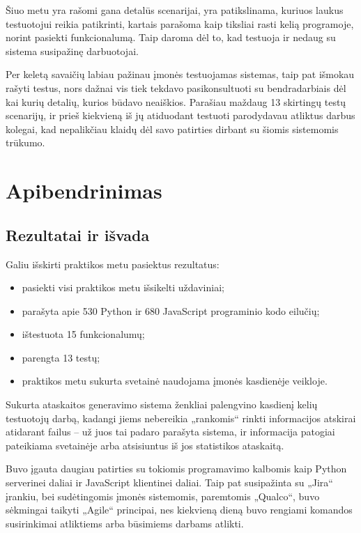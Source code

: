 \documentclass{VUMIFPSkursinis}
\begin{document}
Šiuo metu yra rašomi gana detalūs scenarijai, yra patikslinama, kuriuos laukus testuotojui reikia patikrinti, kartais parašoma kaip tiksliai rasti kelią programoje, norint pasiekti funkcionalumą. Taip daroma dėl to, kad testuoja ir nedaug su sistema susipažinę darbuotojai.

Per keletą savaičių labiau pažinau įmonės testuojamas sistemas, taip pat išmokau rašyti testus, nors dažnai vis tiek tekdavo pasikonsultuoti su bendradarbiais dėl kai kurių detalių, kurios būdavo neaiškios. Parašiau maždaug 13 skirtingų testų scenarijų, ir prieš kiekvieną iš jų atiduodant testuoti parodydavau atliktus darbus kolegai, kad nepalikčiau klaidų dėl savo patirties dirbant su šiomis sistemomis trūkumo.

\section{Apibendrinimas}

\subsection{Rezultatai ir išvada}

Galiu išskirti praktikos metu pasiektus rezultatus:
\begin{itemize}
    \item pasiekti visi praktikos metu išsikelti uždaviniai;
    \item parašyta apie 530 Python ir 680 JavaScript programinio kodo eilučių;
    \item ištestuota 15 funkcionalumų;
    \item parengta 13 testų;
    \item praktikos metu sukurta svetainė naudojama įmonės kasdienėje veikloje.
\end{itemize}
\bigskip

Sukurta ataskaitos generavimo sistema ženkliai palengvino kasdienį kelių testuotojų darbą, kadangi jiems nebereikia „rankomis“ rinkti informacijos atskirai atidarant failus -- už juos tai padaro parašyta sistema, ir informacija patogiai pateikiama svetainėje arba atsisiuntus iš jos statistikos ataskaitą.

Buvo įgauta daugiau patirties su tokiomis programavimo kalbomis kaip Python serverinei daliai ir JavaScript klientinei daliai. Taip pat susipažinta su „Jira“ įrankiu, bei sudėtingomis įmonės sistemomis, paremtomis „Qualco“, buvo sėkmingai taikyti „Agile“ principai, nes kiekvieną dieną buvo rengiami komandos susirinkimai atliktiems arba būsimiems darbams atlikti. 
\end{document}
